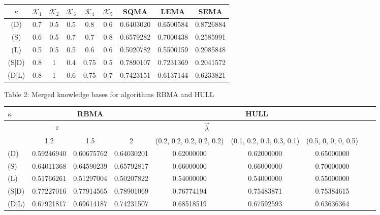 \documentclass[10pt,a4paper]{IOS-Book-Article}
\begin{document}
\begin{table*}
\begin{tabular}{|c|c|c|c|c|c|c|c|c|}
\hline
$\kappa$ & $\mathcal{K}_1$ & $\mathcal{K}_2$ & $\mathcal{K}_3$ & $\mathcal{K}_4$ & $\mathcal{K}_5$ & SQMA & LEMA & SEMA\\
\hline
(D)   &  0.7 &  0.5 &  0.5 &  0.8   &  0.6 &  0.6403020 &  0.6500584 &  0.8726884 \\
(S)   &  0.6 &  0.5 &  0.7 &  0.7   &  0.8 &  0.6579282 &  0.7000438 &  0.2585991 \\
(L)   &  0.5 &  0.5 &  0.5 &  0.6   &  0.6 &  0.5020782 &  0.5500159 &  0.2085848 \\
(S|D) &  0.8 &  1   &  0.4 &  0.75  &  0.5 &  0.7890107 &  0.7231369 &  0.2041572 \\
(D|L) &  0.8 &  1   &  0.6 &  0.75  &  0.7 &  0.7423151 &  0.6137144 &  0.6233821 \\
\hline
\end{tabular}
\end{table*}

Table 2: Merged knowledge bases for algorithms RBMA and HULL

\begin{table*}
\begin{tabular}{|l|c|c|c|c|c|c|c|c|}
\hline
\multirow{3}{3em}{$\kappa$} & \multicolumn{3}{|c|}{RBMA} & \multicolumn{3}{|c|}{HULL}\\
\hline
\multicolumn{3}{|c|}{r} & \multicolumn{3}{|c|}{$\vec{\lambda}$}\\
\hline
      & 1.2        &   1.5       &   2  &  (0.2, 0.2, 0.2, 0.2, 0.2)& (0.1, 0.2, 0.3, 0.3, 0.1)&(0.5, 0, 0, 0, 0.5)\\
\hline
(D)   & 0.59246940 &  0.60675762 &  0.64030201 &  0.62000000        &       0.62000000         &      0.65000000\\
(S)   & 0.64011368 &  0.64590239 &  0.65792817 &  0.66000000        &       0.66000000         &      0.70000000\\
(L)   & 0.51766261 &  0.51297004 &  0.50207822 &  0.54000000        &       0.54000000         &      0.55000000\\
(S|D) & 0.77227016 &  0.77914565 &  0.78901069 &  0.76774194        &       0.75483871         &      0.75384615\\
(D|L) & 0.67921817 &  0.69614187 &  0.74231507 &  0.68518519        &       0.67592593         &      0.63636364\\
\end{tabular}
\end{table*}
\end{document}
